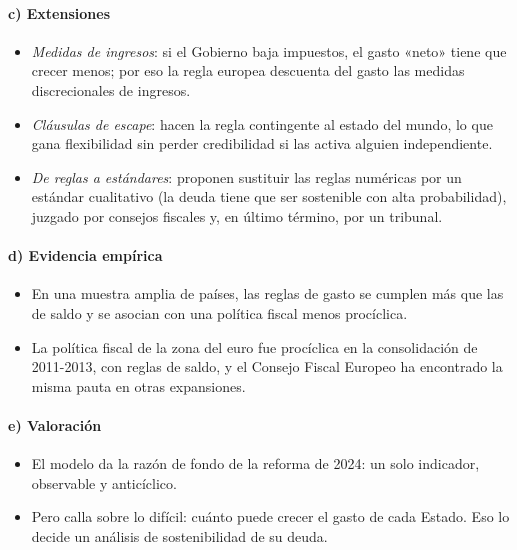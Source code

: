\documentclass[11pt]{article}
\begin{document}
\paragraph{c) Extensiones}

\begin{itemize}
\item \emph{Medidas de ingresos}: si el Gobierno baja impuestos, el gasto «neto» tiene que crecer menos; por eso la regla europea descuenta del gasto las medidas discrecionales de ingresos.
\item \emph{Cláusulas de escape}: hacen la regla contingente al estado del mundo, lo que gana flexibilidad sin perder credibilidad si las activa alguien independiente.
\item \emph{De reglas a estándares}: \textcite{BlanchardLeandroZettelmeyer2021} proponen sustituir las reglas numéricas por un estándar cualitativo (la deuda tiene que ser sostenible con alta probabilidad), juzgado por consejos fiscales y, en último término, por un tribunal.
\end{itemize}

\paragraph{d) Evidencia empírica}

\begin{itemize}
\item En una muestra amplia de países, las reglas de gasto se cumplen más que las de saldo y se asocian con una política fiscal menos procíclica\nocite{Cordes2015Expenditure}.
\item La política fiscal de la zona del euro fue procíclica en la consolidación de 2011-2013, con reglas de saldo, y el Consejo Fiscal Europeo ha encontrado la misma pauta en otras expansiones.
\end{itemize}

\paragraph{e) Valoración}

\begin{itemize}
\item El modelo da la razón de fondo de la reforma de 2024: un solo indicador, observable y anticíclico.
\item Pero calla sobre lo difícil: cuánto puede crecer el gasto de cada Estado. Eso lo decide un análisis de sostenibilidad de su deuda.
\end{itemize}
\end{document}
